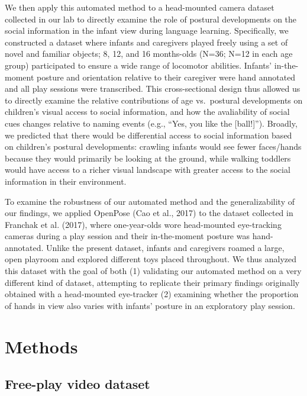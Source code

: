 \documentclass[english,man]{apa6}
\begin{document}
We then apply this automated method to a head-mounted camera dataset
collected in our lab to directly examine the role of postural
developments on the social information in the infant view during
language learning. Specifically, we constructed a dataset where infants
and caregivers played freely using a set of novel and familiar objects;
8, 12, and 16 months-olds (N=36; N=12 in each age group) participated to
ensure a wide range of locomotor abilities. Infants' in-the-moment
posture and orientation relative to their caregiver were hand annotated
and all play sessions were transcribed. This cross-sectional design thus
allowed us to directly examine the relative contributions of age
vs.~postural developments on children's visual access to social
information, and how the avaliability of social cues changes relative to
naming events (e.g., \enquote{Yes, you like the {[}ball!{]}}). Broadly,
we predicted that there would be differential access to social
information based on children's postural developments: crawling infants
would see fewer faces/hands because they would primarily be looking at
the ground, while walking toddlers would have access to a richer visual
landscape with greater access to the social information in their
environment.

To examine the robustness of our automated method and the
generalizability of our findings, we applied OpenPose (Cao et al., 2017)
to the dataset collected in Franchak et al. (2017), where one-year-olds
wore head-mounted eye-tracking cameras during a play session and their
in-the-moment posture was hand-annotated. Unlike the present dataset,
infants and caregivers roamed a large, open playroom and explored
different toys placed throughout. We thus analyzed this dataset with the
goal of both (1) validating our automated method on a very different
kind of dataset, attempting to replicate their primary findings
originally obtained with a head-mounted eye-tracker (2) examining
whether the proportion of hands in view also varies with infants'
posture in an exploratory play session.

\section{Methods}\label{methods}

\subsection{Free-play video dataset}\label{free-play-video-dataset}
\end{document}
